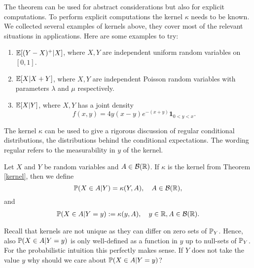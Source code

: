 The theorem can be used for abstract considerations but also for explicit computations. To perform explicit computations the kernel $\kappa$ needs to be known. We collected several examples of kernels above, they cover most of the relevant situations in applications. Here are some examples to try:
\begin{luebung}
	\begin{enumerate}[label=(\roman*)]
			\item $\E[(Y-X)^+|X]$, where $X,Y$ are independent uniform random variables on $[0,1]$.
				\item $\E[X|X+Y]$, where $X,Y$ are independent Poisson random variables with parameters $\lambda$ and $\mu$ respectively.
		\item $\E[X|Y]$, where $X,Y$ has a joint density
		\begin{equation*}
			f(x,y)=4y(x-y)e^{-(x+y)} \mathbf 1_{0<y<x}.
		\end{equation*}
	\end{enumerate}
\end{luebung}
The kernel $\kappa$ can be used to give a rigorous discussion of regular conditional distributions, the distributions behind the conditional expectations. The wording regular refers to the measurability in $y$ of the kernel.
\begin{llemma}
\begin{deff}
	Let $X$ and $Y$ be random variables and $A\in \mathcal B(\R)$. If $\kappa$ is the kernel from Theorem \ref{kernel}, then we define $$\P(X\in A|Y)=\kappa(Y,A),\quad A\in \mathcal B(\R),$$
	and 
	\begin{align*}
			\P(X\in A|Y=y):=\kappa(y,A),\quad y\in \R, A\in \mathcal B(\R).
	\end{align*}

\end{deff}
\end{llemma}

	Recall that kernels are not unique as they can differ on zero sets of $\P_Y$. Hence, also $\P(X\in A|Y=y)$ is only well-defined as a function in $y$ up to null-sets of $\P_Y$. For the probabilistic intuition this perfectly makes sense. If $Y$ does not take the value $y$ why should we care about $\P(X\in A|Y=y)$?\smallskip


